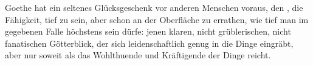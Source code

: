 Goethe hat ein seltenes Glücksgeschenk vor anderen Menschen voraus, den  , die Fähigkeit, tief zu sein, aber schon an der Oberfläche zu errathen, wie tief man im gegebenen Falle höchstens sein dürfe: jenen klaren, nicht grüblerischen, nicht fanatischen Götterblick, der sich leidenschaftlich genug in die Dinge eingräbt, aber nur soweit als das Wohlthuende und Kräftigende der Dinge reicht.
\par


